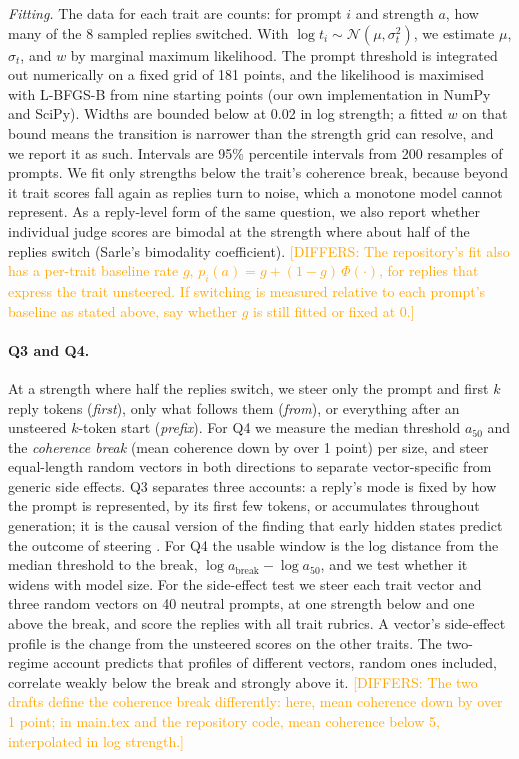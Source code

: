 \documentclass[11pt]{article}
\newcommand{\differ}[1]{\textcolor{orange}{[DIFFERS: #1]}}
\newcommand{\upd}[1]{{\color{blue}#1}}
\begin{document}
\upd{\emph{Fitting.} The data for each trait are counts: for prompt $i$ and
strength $a$, how many of the 8 sampled replies switched. With $\log t_i \sim
\mathcal{N}(\mu, \sigma_t^2)$, we estimate $\mu$, $\sigma_t$, and $w$ by marginal
maximum likelihood. The prompt threshold is integrated out numerically on a
fixed grid of 181 points, and the likelihood is maximised with L-BFGS-B from
nine starting points (our own implementation in NumPy and SciPy). Widths are
bounded below at 0.02 in log strength; a fitted $w$ on that bound means the
transition is narrower than the strength grid can resolve, and we report it as
such. Intervals are 95\% percentile intervals from 200 resamples of prompts. We
fit only strengths below the trait's coherence break, because beyond it trait
scores fall again as replies turn to noise, which a monotone model cannot
represent. As a reply-level form of the same question, we also report whether
individual judge scores are bimodal at the strength where about half of the
replies switch (Sarle's bimodality coefficient).}
\differ{The repository's fit also has a per-trait baseline rate $g$, $p_i(a) = g
+ (1-g)\,\Phi(\cdot)$, for replies that express the trait unsteered. If
switching is measured relative to each prompt's baseline as stated above, say
whether $g$ is still fitted or fixed at 0.}

\paragraph{Q3 and Q4.} At a strength where half the replies switch, we steer only the prompt and first $k$ reply tokens (\emph{first}), only what follows them (\emph{from}), or everything after an unsteered $k$-token start (\emph{prefix}). For Q4 we measure the median threshold $a_{50}$ and the \emph{coherence break} (mean coherence down by over 1 point) per size, and steer equal-length random vectors in both directions to separate vector-specific from generic side effects.
\upd{Q3 separates three accounts: a reply's mode is fixed by how the prompt is
represented, by its first few tokens, or accumulates throughout generation; it
is the causal version of the finding that early hidden states predict the
outcome of steering \cite{fan2026steerable}. For Q4 the usable window is the log
distance from the median threshold to the break, $\log a_{\mathrm{break}} - \log
a_{50}$, and we test whether it widens with model size. For the side-effect test
we steer each trait vector and three random vectors on 40 neutral prompts, at
one strength below and one above the break, and score the replies with all
trait rubrics. A vector's side-effect profile is the change from the unsteered
scores on the other traits. The two-regime account predicts that profiles of
different vectors, random ones included, correlate weakly below the break and
strongly above it.}
\differ{The two drafts define the coherence break differently: here, mean
coherence down by over 1 point; in main.tex and the repository code, mean
coherence below 5, interpolated in log strength.}
\end{document}
